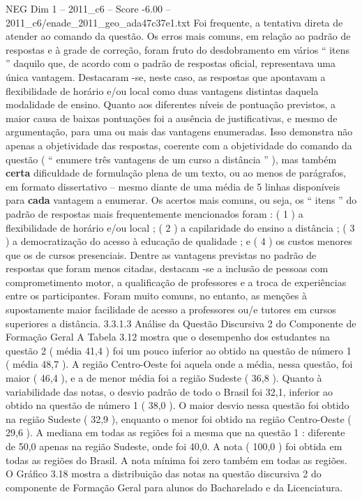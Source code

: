 \begin{textsample}{NEG Dim 1 – 2011\_c6 – Score -6.00 – 2011\_c6/enade\_2011\_geo\_ada47c37e1.txt}
Foi frequente, a tentativa direta de atender ao comando da questão.
Os erros mais comuns, em relação ao padrão de respostas e à grade de correção, foram fruto do desdobramento em vários “ itens ” daquilo que, de acordo com o padrão de respostas oficial, representava uma única vantagem.
Destacaram -se, neste caso, as respostas que apontavam a flexibilidade de horário e/ou local como duas vantagens distintas daquela modalidade de ensino.
Quanto aos diferentes níveis de pontuação previstos, a maior causa de baixas pontuações foi a ausência de justificativas, e mesmo de argumentação, para uma ou mais das vantagens enumeradas.
Isso demonstra não apenas a objetividade das respostas, coerente com a objetividade do comando da questão ( “ enumere três vantagens de um curso a distância ” ), mas também \textbf{certa} dificuldade de formulação plena de um texto, ou ao menos de parágrafos, em formato dissertativo – mesmo diante de uma média de 5 linhas disponíveis para \textbf{cada} vantagem a enumerar.
Os acertos mais comuns, ou seja, os “ itens ” do padrão de respostas mais frequentemente mencionados foram : ( 1 ) a flexibilidade de horário e/ou local ; ( 2 ) a capilaridade do ensino a distância ; ( 3 ) a democratização do acesso à educação de qualidade ; e ( 4 ) os custos menores que os de cursos presenciais.
Dentre as vantagens previstas no padrão de respostas que foram menos citadas, destacam -se a inclusão de pessoas com comprometimento motor, a qualificação de professores e a troca de experiências entre os participantes.
Foram muito comuns, no entanto, as menções à supostamente maior facilidade de acesso a professores ou/e tutores em cursos superiores a distância. 3.3.1.3 Análise da Questão Discursiva 2 do Componente de Formação Geral A Tabela 3.12 mostra que o desempenho dos estudantes na questão 2 ( média 41,4 ) foi um pouco inferior ao obtido na questão de número 1 ( média 48,7 ).
A região Centro-Oeste foi aquela onde a média, nessa questão, foi maior ( 46,4 ), e a de menor média foi a região Sudeste ( 36,8 ).
Quanto à variabilidade das notas, o desvio padrão de todo o Brasil foi 32,1, inferior ao obtido na questão de número 1 ( 38,0 ).
O maior desvio nessa questão foi obtido na região Sudeste ( 32,9 ), enquanto o menor foi obtido na região Centro-Oeste ( 29,6 ).
A mediana em todas as regiões foi a mesma que na questão 1 : diferente de 50,0 apenas na região Sudeste, onde foi 40,0.
A nota ( 100,0 ) foi obtida em todas as regiões do Brasil.
A nota mínima foi zero também em todas as regiões.
O Gráfico 3.18 mostra a distribuição das notas na questão discursiva 2 do componente de Formação Geral para alunos do Bacharelado e da Licenciatura.

\end{textsample}
